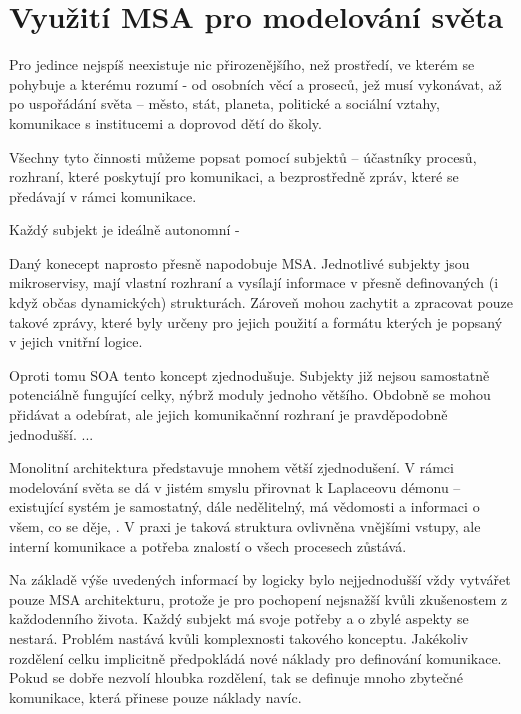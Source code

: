 \section{Využití \gls{MSA} pro modelování světa}

Pro jedince nejspíš neexistuje nic přirozenějšího, než prostředí, ve kterém se pohybuje a kterému rozumí - od osobních věcí a proseců, jež musí vykonávat, až po uspořádání světa – město, stát, planeta, politické a sociální vztahy, komunikace s institucemi a doprovod dětí do školy.

Všechny tyto činnosti můžeme popsat pomocí subjektů – účastníky procesů, rozhraní, které poskytují pro komunikaci, a bezprostředně zpráv, které se předávají v rámci komunikace.

Každý subjekt je ideálně autonomní -

Daný konecept naprosto přesně napodobuje \gls{MSA}.
Jednotlivé subjekty jsou mikroservisy, mají vlastní rozhraní a vysílají informace v přesně definovaných (i když občas dynamických) strukturách.
Zároveň mohou zachytit a zpracovat pouze takové zprávy, které byly určeny pro jejich použití a formátu kterých je popsaný v jejich vnitřní logice.

Oproti tomu \gls{SOA} tento koncept zjednodušuje.
Subjekty již nejsou samostatně potenciálně fungující celky, nýbrž moduly jednoho většího.
Obdobně se mohou přidávat a odebírat, ale jejich komunikačnní rozhraní je pravděpodobně jednodušší.
...

Monolitní architektura představuje mnohem větší zjednodušení.
V rámci modelování světa se dá v jistém smyslu přirovnat k Laplaceovu démonu – existující systém je samostatný, dále nedělitelný, má vědomosti a informaci o všem, co se děje, .
V praxi je taková struktura ovlivněna vnějšími vstupy, ale interní komunikace a potřeba znalostí o všech procesech zůstává.



Na základě výše uvedených informací by logicky bylo nejjednodušší vždy vytvářet pouze \gls{MSA} architekturu, protože je pro pochopení nejsnažší kvůli zkušenostem z každodenního života.
Každý subjekt má svoje potřeby a o zbylé aspekty se nestará.
Problém nastává kvůli komplexnosti takového konceptu.
Jakékoliv rozdělení celku implicitně předpokládá nové náklady pro definování komunikace.
Pokud se dobře nezvolí hloubka rozdělení, tak se definuje mnoho zbytečné komunikace, která přinese pouze náklady navíc.

